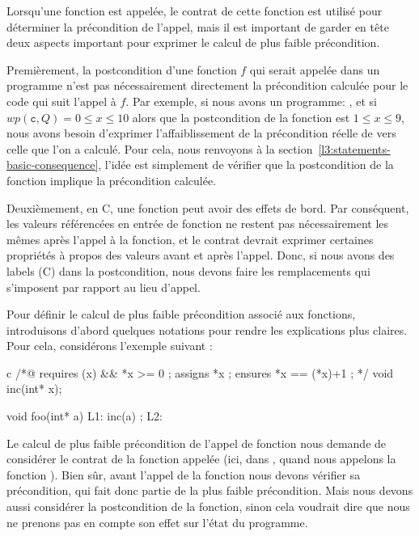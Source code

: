 

Lorsqu'une fonction est appelée, le contrat de cette fonction est utilisé pour
déterminer la précondition de l'appel, mais il est important de garder en tête deux
aspects important pour exprimer le calcul de plus faible précondition.


Premièrement, la postcondition d'une fonction $f$ qui serait appelée dans un 
programme n'est pas nécessairement directement la précondition calculée pour le code
qui suit l'appel à $f$. Par exemple, si nous avons un programme:
, et si $wp(\texttt{c}, Q) = 0 \leq x \leq 10$ alors que
la postcondition de la fonction  est $1 \leq x \leq 9$, nous avons
besoin d'exprimer l'affaiblissement de la précondition réelle de 
vers celle que l'on a calculé. Pour cela, nous renvoyons à la
section~\ref{l3:statements-basic-consequence}, l'idée est simplement de vérifier 
que la postcondition de la fonction implique la précondition calculée.



Deuxièmement, en C, une fonction peut avoir des effets de bord. Par conséquent, les
valeurs référencées en entrée de fonction ne restent pas nécessairement les mêmes
après l'appel à la fonction, et le contrat devrait exprimer certaines propriétés à
propos des valeurs avant et après l'appel. Donc, si nous avons des labels (C) dans
la postcondition, nous devons faire les remplacements qui s'imposent par rapport au
lieu d'appel.



Pour définir le calcul de plus faible précondition associé aux fonctions, introduisons
d'abord quelques notations pour rendre les explications plus claires. Pour cela,
considérons l'exemple suivant :

\begin{CodeBlock}{c}
/*@ requires \valid(x) && *x >= 0 ;
    assigns *x ;
    ensures *x == \old(*x)+1 ; */
void inc(int* x);

void foo(int* a){
  L1:
  inc(a) ;
  L2:
}
\end{CodeBlock}


Le calcul de plus faible précondition de l'appel de fonction nous demande de
considérer le contrat de la fonction appelée (ici, dans , quand
nous appelons la fonction ). Bien sûr, avant l'appel de la fonction
nous devons vérifier sa précondition, qui fait donc partie de la plus faible
précondition. Mais nous devons aussi considérer la postcondition de la fonction,
sinon cela voudrait dire que nous ne prenons pas en compte son effet sur l'état du
programme.


